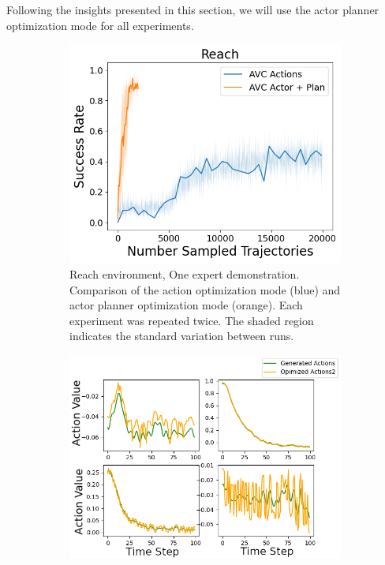 Following the insights presented in this section, we will use the actor planner optimization mode for all experiments.

\begin{figure}[htbp]
    \centering
    \begin{subfigure}[t]{0.65\textwidth}
      \includegraphics[width=\textwidth]{images/Plan_vs_Actions/Reach.png}
      \caption{Reach environment, One expert demonstration. Comparison of the action optimization mode (blue) and actor planner optimization mode (orange).
      Each experiment was repeated twice. The shaded region indicates the standard variation between runs. }
    \end{subfigure}
    \medskip
    \begin{subfigure}[t]{0.45\textwidth}
      \includegraphics[width=\textwidth]{images/Plan_vs_Actions/changes_axis/actions_1_axis.png}

\end{subfigure}
\end{figure}
